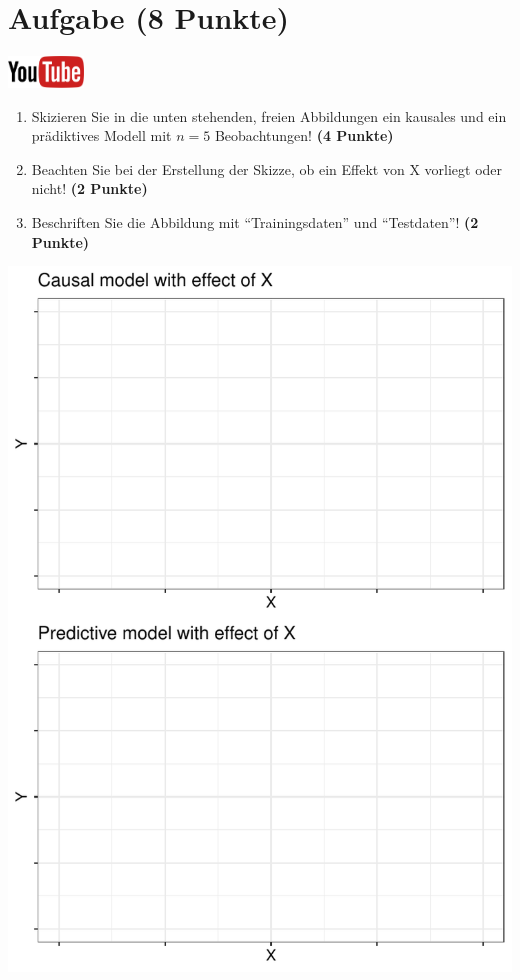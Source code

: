 \documentclass[a4paper, 10pt]{scrartcl}\usepackage[]{graphicx}\usepackage[]{xcolor}
\makeatletter
\def\maxwidth{ %
  \ifdim\Gin@nat@width>\linewidth
    \linewidth
  \else
    \Gin@nat@width
  \fi
}
\makeatother
\begin{document}
\section{Aufgabe \hfill (8 Punkte)}

\hfill\href{https://youtu.be/C_a8aOMI7GE}{\includegraphics[width =
  2cm]{img/youtube}}\\[1Ex]



\begin{enumerate}
\item Skizieren Sie in die unten stehenden, freien Abbildungen ein kausales
  und ein pr{\"a}diktives Modell mit $n = 5$
  Beobachtungen! \textbf{(4 Punkte)}
\item Beachten Sie bei der Erstellung der Skizze, ob ein Effekt von X
  vorliegt oder nicht! \textbf{(2 Punkte)}
\item Beschriften Sie die Abbildung mit "`Trainingsdaten"' und "`Testdaten"'!  \textbf{(2 Punkte)}
\end{enumerate}



{\centering \includegraphics[width=\maxwidth]{img/modeling-01-1} 

}
\end{document}
